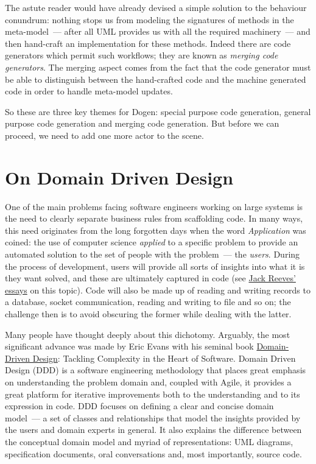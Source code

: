 \documentclass{book}
\begin{document}
The astute reader would have already devised a simple solution to the
behaviour conundrum: nothing stops us from modeling the signatures of
methods in the meta-model~--- after all UML provides us with all the
required machinery~--- and then hand-craft an implementation for these
methods. Indeed there are code generators which permit such workflows;
they are known as \emph{merging code generators}. The merging aspect
comes from the fact that the code generator must be able to
distinguish between the hand-crafted code and the machine generated
code in order to handle meta-model updates.

So these are three key themes for Dogen: special purpose code
generation, general purpose code generation and merging code
generation. But before we can proceed, we need to add one more actor
to the scene.

\section{On Domain Driven Design}

One of the main problems facing software engineers working on large
systems is the need to clearly separate business rules from
scaffolding code. In many ways, this need originates from the long
forgotten days when the word \emph{Application} was coined: the use of
computer science \emph{applied} to a specific problem to provide an
automated solution to the set of people with the problem~--- the
\emph{users}. During the process of development, users will provide
all sorts of insights into what it is they want solved, and these are
ultimately captured in code (see
\href{http://www.developerdotstar.com/mag/articles/PDF/DevDotStar_Reeves_CodeAsDesign.pdf}{Jack
  Reeves' essays} on this topic). Code will also be made up of reading
and writing records to a database, socket communication, reading and
writing to file and so on; the challenge then is to avoid obscuring
the former while dealing with the latter.

Many people have thought deeply about this dichotomy. Arguably, the
most significant advance was made by Eric Evans with his seminal book
\href{http://www.amazon.co.uk/Domain-driven-Design-Tackling-Complexity-Software/dp/0321125215}{Domain-Driven
  Design}: Tackling Complexity in the Heart of
Software\cite{evans2004domain}. Domain Driven Design (DDD) is a
software engineering methodology that places great emphasis on
understanding the problem domain and, coupled with Agile, it provides
a great platform for iterative improvements both to the understanding
and to its expression in code. DDD focuses on defining a clear and
concise domain model~--- a set of classes and relationships that model
the insights provided by the users and domain experts in general. It
also explains the difference between the conceptual domain model and
myriad of representations: UML diagrams, specification documents, oral
conversations and, most importantly, source code.
\end{document}
